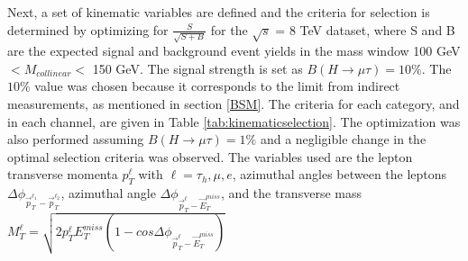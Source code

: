 \documentclass[oneside, letterpaper, oldfontcommands]{memoir}
\begin{document}
\qquad Next, a set of kinematic variables are defined and the criteria for selection is determined by optimizing for $\frac{S}{\sqrt{S+B}}$ for the $\sqrt{s}$ = 8 TeV dataset, where S and B are the expected signal and background event yields in the mass window 100 GeV $< M_{collinear} <$ 150 GeV. The signal strength is set as $B(H\rightarrow\mu\tau) = 10\%$. The $10\%$ value was chosen because it corresponds to the limit from indirect measurements, as mentioned in section \ref{BSM}. The criteria for each category, and in each channel, are given in Table \ref{tab:kinematicselection}. The optimization was also performed assuming $B(H\rightarrow\mu\tau) = 1\%$ and a negligible change in the optimal selection criteria was observed. The variables used are the lepton transverse momenta $p_{T}^{\ell}$ with $\ell = \tau_{h},\mu,e$, azimuthal angles between the leptons 
$\Delta\phi_{\vec{p}_{T}^{\ell_{1}}-\vec{p}_{T}^{\ell_{2}}}$, azimuthal angle 
$\Delta\phi_{\vec{p}_{T}^{\ell}-\vec{E}_{T}^{miss}}$, and the transverse mass 
$M_{T}^{\ell} = \sqrt{2 p_{T}^{\ell}E_{T}^{miss}(1-cos \Delta\phi_{\vec{p}_{T}^{\ell}-\vec{E}_{T}^{miss}})}$ 
\end{document}
